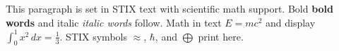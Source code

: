 \documentclass{article}
\begin{document}
This paragraph is set in STIX text with scientific math support.
Bold \textbf{bold words} and italic \textit{italic words} follow.
Math in text $E = mc^2$ and display $\int_0^1 x^2\,dx = \frac{1}{3}$.
STIX symbols $\approx$, $\hbar$, and $\bigoplus$ print here.
\end{document}

